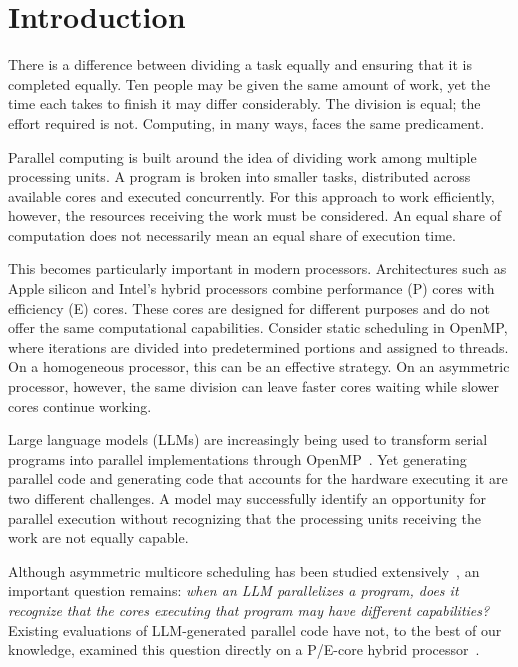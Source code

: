 \documentclass[conference]{IEEEtran}
\begin{document}
\section{Introduction}
There is a difference between dividing a task equally and ensuring that it is completed equally. Ten people may be given the same amount of work, yet the time each takes to finish it may differ considerably. The division is equal; the effort required is not. Computing, in many ways, faces the same predicament.

Parallel computing is built around the idea of dividing work among multiple processing units. A program is broken into smaller tasks, distributed across available cores and executed concurrently. For this approach to work efficiently, however, the resources receiving the work must be considered. An equal share of computation does not necessarily mean an equal share of execution time.

This becomes particularly important in modern processors. Architectures such as Apple silicon and Intel's hybrid processors combine performance (P) cores with efficiency (E) cores. These cores are designed for different purposes and do not offer the same computational capabilities. Consider static scheduling in OpenMP, where iterations are divided into predetermined portions and assigned to threads. On a homogeneous processor, this can be an effective strategy. On an asymmetric processor, however, the same division can leave faster cores waiting while slower cores continue working.

Large language models (LLMs) are increasingly being used to transform serial programs into parallel implementations through OpenMP~\cite{nichols2024pareval,chen2024ompgpt,mahmud2025autoparllm,kadosh2024ompar}. Yet generating parallel code and generating code that accounts for the hardware executing it are two different challenges. A model may successfully identify an opportunity for parallel execution without recognizing that the processing units receiving the work are not equally capable.

Although asymmetric multicore scheduling has been studied extensively~\cite{david2017amp,saez2020aid,intel2025mkl,beserra2026amp}, an important question remains: \emph{when an LLM parallelizes a program, does it recognize that the cores executing that program may have different capabilities?} Existing evaluations of LLM-generated parallel code have not, to the best of our knowledge, examined this question directly on a P/E-core hybrid processor~\cite{codegenbench2026}.
\end{document}
